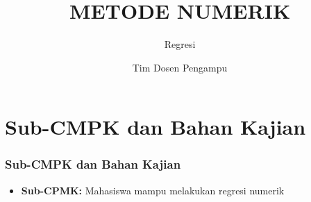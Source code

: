 \documentclass[pdflatex,compress,mathserif]{beamer}
\title{METODE NUMERIK}
\subtitle{Regresi}
\author{Tim Dosen Pengampu}
\begin{document}
\maketitle

\section{Sub-CMPK dan Bahan Kajian}

\begin{frame}
	\frametitle{Sub-CMPK dan Bahan Kajian}
	\begin{itemize}
		\item \textbf{Sub-CPMK:} Mahasiswa mampu melakukan regresi numerik
	\end{itemize}
\end{frame}
\end{document}
